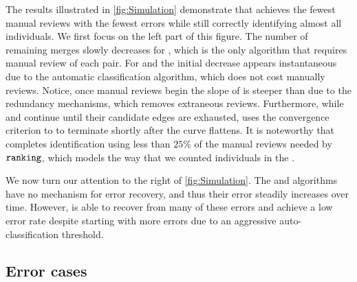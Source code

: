     \Simulation{}

    \Refresh{}

    The results illustrated in \cref{fig:Simulation} demonstrate that  achieves the fewest manual
      reviews with the fewest errors while still correctly identifying almost all individuals.
    We first focus on the left part of this figure.
    The number of remaining merges slowly decreases for , which is the only algorithm that requires
      manual review of each pair.
    For  and  the initial decrease appears instantaneous due to the automatic
      classification algorithm, which does not cost manually reviews.
    Notice, once manual reviews begin the slope of  is steeper than  due to the
      redundancy mechanisms, which removes extraneous reviews.
    Furthermore, while  and  continue until their candidate edges are exhausted,
       uses the convergence criterion to to terminate shortly after the curve flattens.
    It is noteworthy that  completes identification using less than $25\percent$ of the manual
      reviews needed by ${\tt{ranking}}$, which models the way that we counted individuals in the \GZC{}.

    We now turn our attention to the right of \cref{fig:Simulation}.
    The  and  algorithms have no mechanism for error recovery, and thus their error
      steadily increases over time.
    However,  is able to recover from many of these errors and achieve a low error rate despite
      starting with more errors due to an aggressive auto-classification threshold.
      
    \subsection{Error cases}

